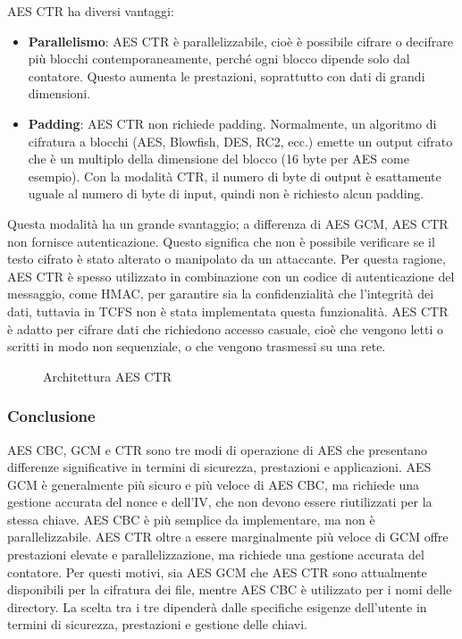 AES CTR ha diversi vantaggi:
\begin{itemize}
    \item \textbf{Parallelismo}: AES CTR è parallelizzabile, cioè è possibile cifrare o decifrare più blocchi contemporaneamente, perché ogni blocco dipende solo dal contatore. Questo aumenta le prestazioni, soprattutto con dati di grandi dimensioni.
    \item \textbf{Padding}: AES CTR non richiede padding. Normalmente, un algoritmo di cifratura a blocchi (AES, Blowfish, DES, RC2, ecc.) emette un output cifrato che è un multiplo della dimensione del blocco (16 byte per AES come esempio). Con la modalità CTR, il numero di byte di output è esattamente uguale al numero di byte di input, quindi non è richiesto alcun padding.
\end{itemize}
Questa modalità ha un grande svantaggio; a differenza di AES GCM, AES CTR non fornisce autenticazione. Questo significa che non è possibile verificare se il testo cifrato è stato alterato o manipolato da un attaccante. Per questa ragione, AES CTR è spesso utilizzato in combinazione con un codice di autenticazione del messaggio, come HMAC, per garantire sia la confidenzialità che l’integrità dei dati, tuttavia in TCFS non è stata implementata questa funzionalità. AES CTR è adatto per cifrare dati che richiedono accesso casuale, cioè che vengono letti o scritti in modo non sequenziale, o che vengono trasmessi su una rete.

\begin{figure}[H]
    \centering
    
    \caption{Architettura AES CTR}
    \label{fig:AES-CTR-diagramma}
\end{figure}

\subsubsection{Conclusione}
AES CBC, GCM e CTR sono tre modi di operazione di AES che presentano differenze significative in termini di sicurezza, prestazioni e applicazioni. AES GCM è generalmente più sicuro e più veloce di AES CBC, ma richiede una gestione accurata del nonce e dell’IV, che non devono essere riutilizzati per la stessa chiave. AES CBC è più semplice da implementare, ma non è parallelizzabile. AES CTR oltre a essere marginalmente più veloce di GCM offre prestazioni elevate e parallelizzazione, ma richiede una gestione accurata del contatore. Per questi motivi, sia AES GCM che AES CTR sono attualmente disponibili per la cifratura dei file, mentre AES CBC è utilizzato per i nomi delle directory. La scelta tra i tre dipenderà dalle specifiche esigenze dell’utente in termini di sicurezza, prestazioni e gestione delle chiavi.

